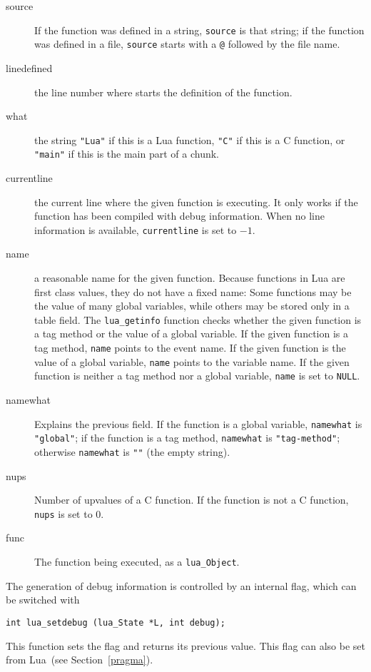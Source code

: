 \documentclass[11pt]{article}
\newcommand{\See}[1]{Section~\ref{#1}}
\newcommand{\see}[1]{(see \See{#1})}
\newcommand{\Math}[1]{$#1$}
\begin{document}
\begin{description}

\item[source]
If the function was defined in a string,
\verb|source| is that string;
if the function was defined in a file,
\verb|source| starts with a \verb|@| followed by the file name.

\item[linedefined]
the line number where starts the definition of the function.

\item[what] the string \verb|"Lua"| if this is a Lua function,
\verb|"C"| if this is a C function,
or \verb|"main"| if this is the main part of a chunk.

\item[currentline]
the current line where the given function is executing.
It only works if the function has been compiled with debug
information.
When no line information is available,
\verb|currentline| is set to \Math{-1}.

\item[name]
a reasonable name for the given function.
Because functions in Lua are first class values,
they do not have a fixed name:
Some functions may be the value of many global variables,
while others may be stored only in a table field.
The \verb|lua_getinfo| function checks whether the given
function is a tag method or the value of a global variable.
If the given function is a tag method,
\verb|name| points to the event name.
If the given function is the value of a global variable,
\verb|name| points to the variable name.
If the given function is neither a tag method nor a global variable,
\verb|name| is set to \verb|NULL|.

\item[namewhat]
Explains the previous field.
If the function is a global variable,
\verb|namewhat| is \verb|"global"|;
if the function is a tag method,
\verb|namewhat| is \verb|"tag-method"|;
otherwise \verb|namewhat| is \verb|""| (the empty string).

\item[nups]
Number of upvalues of a C function.
If the function is not a C function,
\verb|nups| is set to 0.

\item[func]
The function being executed, as a \verb|lua_Object|.

\end{description}

The generation of debug information is controlled by an internal flag,
which can be switched with
\begin{verbatim}
int lua_setdebug (lua_State *L, int debug);
\end{verbatim}
This function sets the flag and returns its previous value.
This flag can also be set from Lua~\see{pragma}.
\end{document}
